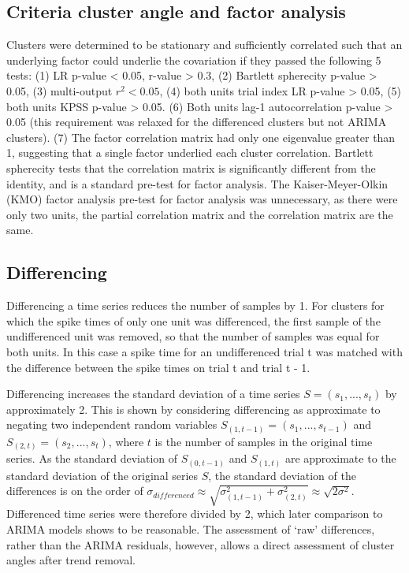 \documentclass{article}
\begin{document}
\subsection{Criteria cluster angle and factor analysis}
\label{methods:angle_and_factor_analysis_criteria}

Clusters were determined to be stationary and sufficiently correlated such that an underlying factor could underlie the covariation if they passed the following 5 tests: (1) LR p-value < 0.05, r-value > 0.3, (2) Bartlett spherecity p-value > 0.05, (3) multi-output $r^2 < 0.05$, (4) both units trial index LR p-value > 0.05, (5) both units KPSS p-value > 0.05. (6) Both units lag-1 autocorrelation p-value > 0.05 (this requirement was relaxed for the differenced clusters but not ARIMA clusters). (7) The factor correlation matrix had only one eigenvalue greater than 1, suggesting that a single factor underlied each cluster correlation. Bartlett spherecity tests that the correlation matrix is significantly different from the identity, and is a standard pre-test for factor analysis. The Kaiser-Meyer-Olkin (KMO) factor analysis pre-test for factor analysis was unnecessary, as there were only two units, the partial correlation matrix and the correlation matrix are the same.




\subsection{Differencing}
\label{methods:differencing}

Differencing a time series reduces the number of samples by 1.
For clusters for which the spike times of only one unit was differenced, the first sample of the undifferenced unit was removed, so that the number of samples was equal for both units. In this case a spike time for an undifferenced trial t was matched with the difference between the spike times on trial t and trial t - 1.

Differencing increases the standard deviation of a time series $S = (s_1, ..., s_t)$ by approximately 2. This is shown by considering differencing as approximate to negating two independent random variables $S_{(1, t-1)} = (s_1, ..., s_{t-1})$ and $S_{(2, t)} = (s_2, ..., s_t)$, where $t$ is the number of samples in the original time series. As the standard deviation of $S_{(0, t-1)}$ and $S_{(1, t)}$ are approximate to the standard deviation of the original series $S$, the standard deviation of the differences is on the order of \(\sigma_{differenced} \approx \sqrt{\sigma_{(1, t-1)}^2 + \sigma_{(2, t)}^2} \approx  \sqrt{2\sigma^2} \).  Differenced time series were therefore divided by 2, which later comparison to ARIMA models shows to be reasonable. 
The assessment of `raw' differences, rather than the ARIMA residuals, however, allows a direct assessment of cluster angles after trend removal.
\end{document}
